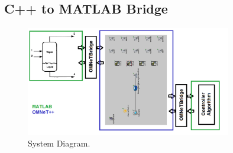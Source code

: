 \subsection{C++ to MATLAB Bridge}
  

\begin{figure}
        \centering
		\includegraphics[width=0.8\textwidth]{figs/system.png}
        \caption{System Diagram.}
        \label{fig:system}        
\end{figure}
